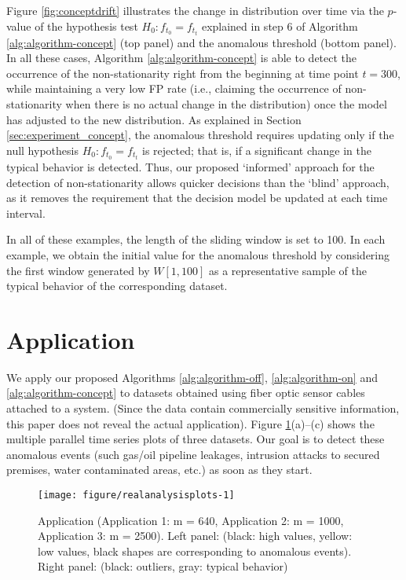 \documentclass[12pt]{article}
\begin{document}
Figure \ref{fig:conceptdrift} illustrates the change in distribution
over time via the \(p\)-value of the hypothesis test
\(H_{0}: f_{t_{0}} = f_{t_{t}}\) explained in step 6 of Algorithm
\ref{alg:algorithm-concept} (top panel) and the anomalous threshold
(bottom panel). In all these cases, Algorithm
\ref{alg:algorithm-concept} is able to detect the occurrence of the
non-stationarity right from the beginning at time point \(t =300\),
while maintaining a very low FP rate (i.e., claiming the occurrence of
non-stationarity when there is no actual change in the distribution)
once the model has adjusted to the new distribution. As explained in
Section \ref{sec:experiment_concept}, the anomalous threshold requires
updating only if the null hypothesis \(H_{0}: f_{t_{0}} = f_{t_{t}}\) is
rejected; that is, if a significant change in the typical behavior is
detected. Thus, our proposed `informed' approach for the detection of
non-stationarity allows quicker decisions than the `blind' approach, as
it removes the requirement that the decision model be updated at each
time interval.

In all of these examples, the length of the sliding window is set to
100. In each example, we obtain the initial value for the anomalous
threshold by considering the first window generated by \(W[1, 100]\) as
a representative sample of the typical behavior of the corresponding
dataset.

\hypertarget{application}{%
\section{Application}\label{application}}

\label{sec:application}

We apply our proposed Algorithms \ref{alg:algorithm-off},
\ref{alg:algorithm-on} and \ref{alg:algorithm-concept} to datasets
obtained using fiber optic sensor cables attached to a system. (Since
the data contain commercially sensitive information, this paper does not
reveal the actual application). Figure
\ref{fig:realanalysisplots}(a)--(c) shows the multiple parallel time
series plots of three datasets. Our goal is to detect these anomalous
events (such gas/oil pipeline leakages, intrusion attacks to secured
premises, water contaminated areas, etc.) as soon as they start.

\begin{figure}[h]

{\centering \texttt{[image: figure/realanalysisplots-1]} 

}

\caption{Application (Application 1: m = 640, Application 2: m = 1000, Application 3: m = 2500). Left panel: (black: high values, yellow: low values, black shapes are corresponding to anomalous events). Right panel: (black: outliers, gray: typical behavior)}\label{fig:realanalysisplots}
\end{figure}
\end{document}
